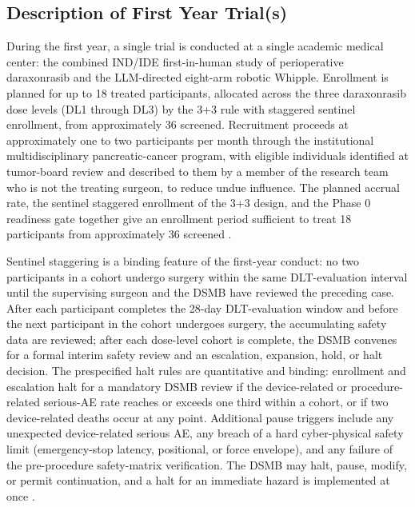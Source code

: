 \subsection{Description of First Year Trial(s)}

During the first year, a single trial is conducted at a single academic medical
center: the combined IND/IDE first-in-human study of perioperative daraxonrasib and
the LLM-directed eight-arm robotic Whipple. Enrollment is planned for up to 18
treated participants, allocated across the three daraxonrasib dose levels (DL1
through DL3) by the 3+3 rule with staggered sentinel enrollment, from approximately
36 screened. Recruitment proceeds at approximately one to two participants per month
through the institutional multidisciplinary pancreatic-cancer program, with eligible
individuals identified at tumor-board review and described to them by a member of the
research team who is not the treating surgeon, to reduce undue influence. The planned
accrual rate, the sentinel staggered enrollment of the 3+3 design, and the Phase 0
readiness gate together give an enrollment period sufficient to treat 18 participants
from approximately 36 screened \cite{daraxwhipple,phase1guidance}.

Sentinel staggering is a binding feature of the first-year conduct: no two
participants in a cohort undergo surgery within the same DLT-evaluation interval
until the supervising surgeon and the DSMB have reviewed the preceding case. After
each participant completes the 28-day DLT-evaluation window and before the next
participant in the cohort undergoes surgery, the accumulating safety data are
reviewed; after each dose-level cohort is complete, the DSMB convenes for a formal
interim safety review and an escalation, expansion, hold, or halt decision. The
prespecified halt rules are quantitative and binding: enrollment and escalation halt
for a mandatory DSMB review if the device-related or procedure-related serious-AE
rate reaches or exceeds one third within a cohort, or if two device-related deaths
occur at any point. Additional pause triggers include any unexpected device-related
serious AE, any breach of a hard cyber-physical safety limit (emergency-stop
latency, positional, or force envelope), and any failure of the pre-procedure
safety-matrix verification. The DSMB may halt, pause, modify, or permit continuation,
and a halt for an immediate hazard is implemented at once \cite{daraxwhipple}.

